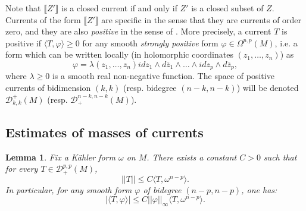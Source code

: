 \documentclass[12pt]{amsbook}%
\newtheorem{lem}[thm]{Lemma}
\theoremstyle{definition}
\theoremstyle{remark}
\numberwithin{section}{chapter}
\numberwithin{subsection}{section}
\numberwithin{figure}{chapter}
\def\cD{{\mathscr{D}}}
\begin{document}
{{Note that $\llbracket Z'\rrbracket$ is a closed current if and only if $Z'$ is a closed subset of $Z$. Currents of the form $\llbracket Z'\rrbracket$ are specific in the sense that they are currents of order zero, and they are also {\em positive} in the sense of \cite[Definition 1.13]{demailly}. More precisely, a current $T$ is positive if  
$\langle T, \varphi \rangle \geqslant 0$ for any  smooth {\em strongly positive} form $\varphi\in \Omega^{p,p}(M)$, 
i.e. a form which can be written locally (in holomorphic coordinates $(z_1 , \ldots, z_n)$) as 
\begin{equation*}
\varphi =  \lambda(z_1, \ldots, z_n)  idz_1 \wedge d \bar z_1 \wedge \ldots \wedge idz_p\wedge d\bar z_p, 
\end{equation*} 
where $\lambda \geq 0$ is a smooth real non-negative function. The space of positive currents of bidimension $(k,k)$ (resp. bidegree $(n-k,n-k)$) 
will be denoted $\cD^+_{k,k}(M)$ (resp. $\cD^{n-k,n-k}_+(M)$). 

 
\subsection{Estimates of masses of currents}



  
 \begin{lem} \label{lem_mass_estimate} Fix a
 K\"ahler form $\omega$ on $M$.
 There exists a constant $C>0$ such that for every $T\in \cD^{p,p}_+(M)$, 
 \begin{equation}
 || T || \leqslant C \langle T, \omega^{n-p} \rangle.
\end{equation}  
In particular, for any smooth form $\varphi$ of bidegree $(n-p,n-p)$, one has: 
\begin{equation*}
| \langle T, \varphi \rangle| \leqslant C ||\varphi||_\infty \langle T,\omega^{n-p} \rangle.
\end{equation*}
 
\end{lem} 
  
}}
\end{document}
